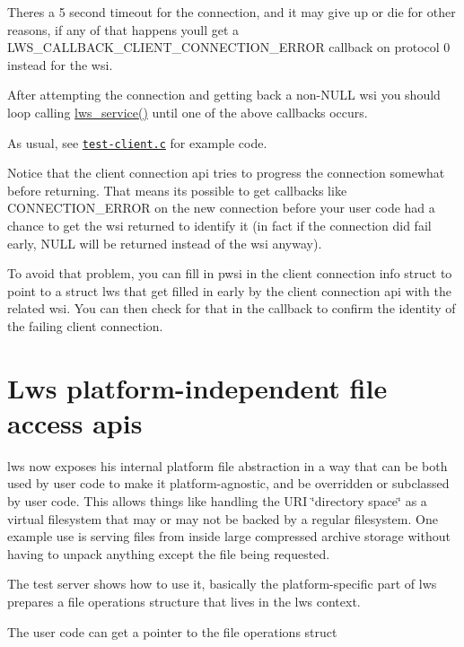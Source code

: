 There\textquotesingle{}s a 5 second timeout for the connection, and it may give up or die for other reasons, if any of that happens you\textquotesingle{}ll get a {\ttfamily L\+W\+S\+\_\+\+C\+A\+L\+L\+B\+A\+C\+K\+\_\+\+C\+L\+I\+E\+N\+T\+\_\+\+C\+O\+N\+N\+E\+C\+T\+I\+O\+N\+\_\+\+E\+R\+R\+OR} callback on protocol 0 instead for the {\ttfamily wsi}.

After attempting the connection and getting back a non-\/{\ttfamily N\+U\+LL} {\ttfamily wsi} you should loop calling {\ttfamily \hyperlink{group__service_gaf95bd0c663d6516a0c80047d9b1167a8}{lws\+\_\+service()}} until one of the above callbacks occurs.

As usual, see \href{test-server/test-client.c}{\tt test-\/client.\+c} for example code.

Notice that the client connection api tries to progress the connection somewhat before returning. That means it\textquotesingle{}s possible to get callbacks like C\+O\+N\+N\+E\+C\+T\+I\+O\+N\+\_\+\+E\+R\+R\+OR on the new connection before your user code had a chance to get the wsi returned to identify it (in fact if the connection did fail early, N\+U\+LL will be returned instead of the wsi anyway).

To avoid that problem, you can fill in {\ttfamily pwsi} in the client connection info struct to point to a struct lws that get filled in early by the client connection api with the related wsi. You can then check for that in the callback to confirm the identity of the failing client connection.\hypertarget{md_README.coding_fileapi}{}\section{Lws platform-\/independent file access apis}\label{md_README.coding_fileapi}
lws now exposes his internal platform file abstraction in a way that can be both used by user code to make it platform-\/agnostic, and be overridden or subclassed by user code. This allows things like handling the U\+RI \char`\"{}directory
space\char`\"{} as a virtual filesystem that may or may not be backed by a regular filesystem. One example use is serving files from inside large compressed archive storage without having to unpack anything except the file being requested.

The test server shows how to use it, basically the platform-\/specific part of lws prepares a file operations structure that lives in the lws context.

The user code can get a pointer to the file operations struct


